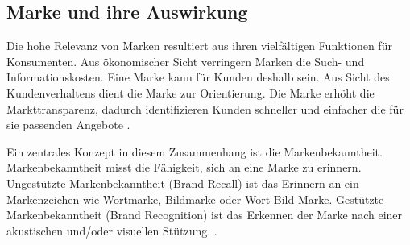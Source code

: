 \subsection{Marke und ihre Auswirkung}
\label{markenimage} 
Die hohe Relevanz von Marken resultiert aus ihren vielfältigen Funktionen für Konsumenten. Aus ökonomischer Sicht verringern Marken die Such- und Informationskosten. Eine Marke kann für Kunden deshalb  sein. Aus Sicht des Kundenverhaltens dient die Marke zur Orientierung. Die Marke erhöht die Markttransparenz, dadurch identifizieren Kunden schneller und einfacher die für sie passenden Angebote \cite[2]{burmann2024}. \par
Ein zentrales Konzept in diesem Zusammenhang ist die Markenbekanntheit. Markenbekanntheit misst die Fähigkeit, sich an eine Marke zu erinnern. Ungestützte Markenbekanntheit (Brand Recall) ist das Erinnern an ein Markenzeichen wie Wortmarke, Bildmarke oder Wort-Bild-Marke. Gestützte Markenbekanntheit (Brand Recognition) ist das Erkennen der Marke nach einer akustischen und/oder visuellen Stützung. \cite[44]{burmann2024}. 

